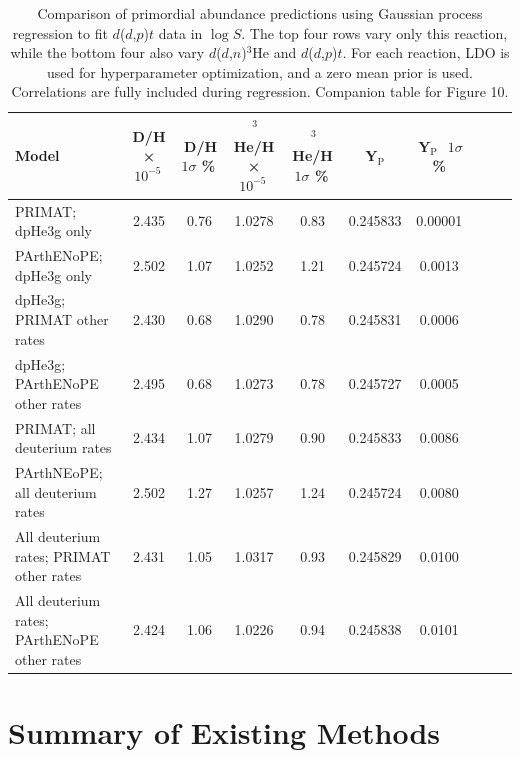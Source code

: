 \documentclass[%
 reprint,
superscriptaddress,
nofootinbib,
 amsmath,amssymb,
 aps,
 pra,
]{revtex4-2}
\begin{document}
\begin{table}[ht]
    \centering
    \caption{Comparison of primordial abundance predictions using Gaussian process regression to fit $d$($d$,$p$)$t$ data in $\log S$. The top four rows vary only this reaction, while the bottom four also vary $d$($d$,$n$)$^3$He and $d$($d$,$p$)$t$. For each reaction, LDO is used for hyperparameter optimization, and a zero mean prior is used. Correlations are fully included during regression. Companion table for Figure 10.}
    \small
    \begin{tabular}{l
                    S[table-format=1.6]
                    S[table-format=1.5]
                    S[table-format=1.3]
                    S[table-format=1.6]
                    S[table-format=1.5]
                    S[table-format=1.3]
                    S[table-format=1.6]
                    S[table-format=1.7]
                    S[table-format=1.4]} 
     \toprule
    {Model} & {D/H × $10^{-5}$\,} & {\,D/H $1\sigma$ \%\,} &
    {\,$^3$He/H × $10^{-5}$\,} & {\,$^3$He/H $1\sigma$ \%\,} &
    {\,Y$_\text{P}$\,} & {\,Y$_\text{P}\,$ $\,1\sigma$ \%} \\
    \midrule
    PRIMAT; dpHe3g only & 2.435 & 0.76 & 1.0278 & 0.83 & 0.245833 & 0.00001 \\
    PArthENoPE; dpHe3g only & 2.502 & 1.07 & 1.0252 & 1.21 & 0.245724 & 0.0013 \\
    dpHe3g; PRIMAT other rates & 2.430 & 0.68 & 1.0290 & 0.78 & 0.245831 & 0.0006 \\
    dpHe3g; PArthENoPE other rates & 2.495 & 0.68 & 1.0273 & 0.78 & 0.245727 & 0.0005 \\
    PRIMAT; all deuterium rates & 2.434 & 1.07 & 1.0279 & 0.90 & 0.245833 & 0.0086 \\
    PArthNEoPE; all deuterium rates & 2.502 & 1.27 & 1.0257 & 1.24 & 0.245724 & 0.0080 \\
    All deuterium rates; PRIMAT other rates & 2.431 & 1.05 & 1.0317 & 0.93 & 0.245829 & 0.0100 \\
    All deuterium rates; PArthENoPE other rates & 2.424 & 1.06 & 1.0226 & 0.94 & 0.245838 & 0.0101 \\    \bottomrule
    \end{tabular}
\end{table}
\clearpage

\section{Summary of Existing Methods}
\end{document}
